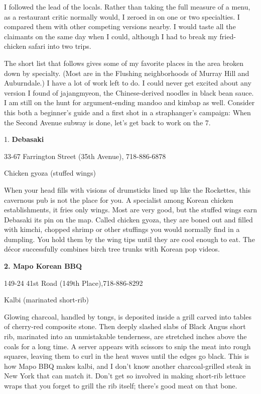 I followed the lead of the locals. Rather than taking the full measure
of a menu, as a restaurant critic normally would, I zeroed in on one or
two specialties. I compared them with other competing versions nearby. I
would taste all the claimants on the same day when I could, although I
had to break my fried-chicken safari into two trips.

The short list that follows gives some of my favorite places in the area
broken down by specialty. (Most are in the Flushing neighborhoods of
Murray Hill and Auburndale.) I have a lot of work left to do. I could
never get excited about any version I found of jajangmyeon, the
Chinese-derived noodles in black bean sauce. I am still on the hunt for
argument-ending mandoo and kimbap as well. Consider this both a
beginner's guide and a first shot in a straphanger's campaign: When the
Second Avenue subway is done, let's get back to work on the 7.

1. \textbf{Debasaki}

33-67 Farrington Street (35th Avenue), 718-886-6878

Chicken gyoza (stuffed wings)

When your head fills with visions of drumsticks lined up like the
Rockettes, this cavernous pub is not the place for you. A specialist
among Korean chicken establishments, it fries only wings. Most are very
good, but the stuffed wings earn Debasaki its pin on the map. Called
chicken gyoza, they are boned out and filled with kimchi, chopped shrimp
or other stuffings you would normally find in a dumpling. You hold them
by the wing tips until they are cool enough to eat. The décor
successfully combines birch tree trunks with Korean pop videos.

\textbf{2. Mapo Korean BBQ}

149-24 41st Road (149th Place),718-886-8292

Kalbi (marinated short-rib)

Glowing charcoal, handled by tongs, is deposited inside a grill carved
into tables of cherry-red composite stone. Then deeply slashed slabs of
Black Angus short rib, marinated into an unmistakable tenderness, are
stretched inches above the coals for a long time. A server appears with
scissors to snip the meat into rough squares, leaving them to curl in
the heat waves until the edges go black. This is how Mapo BBQ makes
kalbi, and I don't know another charcoal-grilled steak in New York that
can match it. Don't get so involved in making short-rib lettuce wraps
that you forget to grill the rib itself; there's good meat on that bone.

